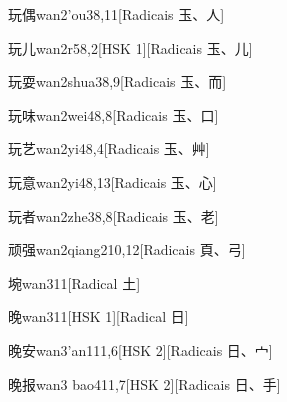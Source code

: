 \begin{entry}{玩偶}{wan2'ou3}{8,11}[Radicais ⽟、⼈]
\end{entry}

\begin{entry}{玩儿}{wan2r5}{8,2}[HSK 1][Radicais ⽟、⼉]
\end{entry}

\begin{entry}{玩耍}{wan2shua3}{8,9}[Radicais ⽟、⽽]
\end{entry}

\begin{entry}{玩味}{wan2wei4}{8,8}[Radicais ⽟、⼝]
\end{entry}

\begin{entry}{玩艺}{wan2yi4}{8,4}[Radicais ⽟、⾋]
\end{entry}

\begin{entry}{玩意}{wan2yi4}{8,13}[Radicais ⽟、⼼]
\end{entry}

\begin{entry}{玩者}{wan2zhe3}{8,8}[Radicais ⽟、⽼]
\end{entry}

\begin{entry}{顽强}{wan2qiang2}{10,12}[Radicais ⾴、⼸]
\end{entry}

\begin{entry}{埦}{wan3}{11}[Radical ⼟]
\end{entry}

\begin{entry}{晚}{wan3}{11}[HSK 1][Radical ⽇]
\end{entry}

\begin{entry}{晚安}{wan3'an1}{11,6}[HSK 2][Radicais ⽇、⼧]
\end{entry}

\begin{entry}{晚报}{wan3 bao4}{11,7}[HSK 2][Radicais ⽇、⼿]
\end{entry}

